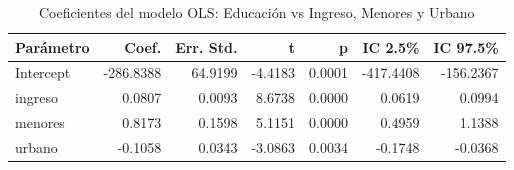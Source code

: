 \begin{table}
\caption{Coeficientes del modelo OLS: Educación vs Ingreso, Menores y Urbano}
\label{tab:ols_coef_educacion}
\begin{tabular}{lrrrrrr}
\toprule
Parámetro & Coef. & Err. Std. & t & p & IC 2.5\% & IC 97.5\% \\
\midrule
Intercept & -286.8388 & 64.9199 & -4.4183 & 0.0001 & -417.4408 & -156.2367 \\
ingreso & 0.0807 & 0.0093 & 8.6738 & 0.0000 & 0.0619 & 0.0994 \\
menores & 0.8173 & 0.1598 & 5.1151 & 0.0000 & 0.4959 & 1.1388 \\
urbano & -0.1058 & 0.0343 & -3.0863 & 0.0034 & -0.1748 & -0.0368 \\
\bottomrule
\end{tabular}
\end{table}
